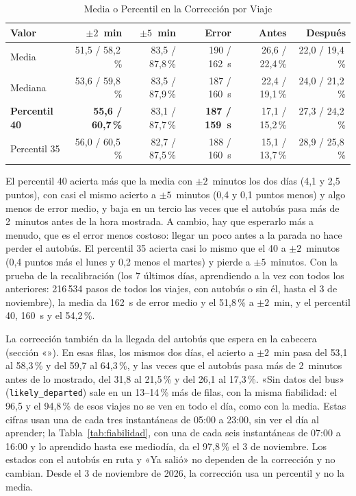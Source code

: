 \begin{table}[ht]
\centering
\caption{Media o Percentil en la Corrección por Viaje}\label{tab:percentil}
\begin{tabular}{@{}lrrrrr@{}}
\toprule
Valor & $\pm2$~min & $\pm5$~min & Error & Antes & Después\\
\midrule
Media & 51,5 / 58,2\,\% & 83,5 / 87,8\,\% & 190 / 162~s & 26,6 / 22,4\,\% & 22,0 / 19,4\,\%\\
Mediana & 53,6 / 59,8\,\% & 83,5 / 87,9\,\% & 187 / 160~s & 22,4 / 19,1\,\% & 24,0 / 21,2\,\%\\
\textbf{Percentil 40} & \textbf{55,6 / 60,7\,\%} & 83,1 / 87,7\,\% & \textbf{187 / 159~s} & 17,1 / 15,2\,\% & 27,3 / 24,2\,\%\\
Percentil 35 & 56,0 / 60,5\,\% & 82,7 / 87,5\,\% & 188 / 160~s & 15,1 / 13,7\,\% & 28,9 / 25,8\,\%\\
\bottomrule
\end{tabular}
\end{table}

El percentil 40 acierta más que la media con $\pm2$~minutos los dos días (4,1 y 2,5 puntos), con casi el mismo acierto
a $\pm5$~minutos (0,4 y 0,1 puntos menos) y algo menos de error medio, y baja en un tercio las veces que el autobús pasa
más de 2~minutos antes de la hora mostrada. A cambio, hay que esperarlo más a menudo, que es el error menos costoso:
llegar un poco antes a la parada no hace perder el autobús. El percentil 35 acierta casi lo mismo que el 40 a $\pm2$~minutos (0,4 puntos más el lunes y 0,2 menos el
martes) y pierde a $\pm5$~minutos. Con la prueba de la recalibración (los 7 últimos días, aprendiendo a la vez con todos los anteriores:
216\,534 pasos de todos los viajes, con autobús o sin él, hasta el 3 de noviembre), la media da 162~s de error medio y
el 51,8\,\% a $\pm2$~min, y el percentil 40, 160~s y el 54,2\,\%.

La corrección también da la llegada del autobús que espera en la cabecera (sección «»). En esas
filas, los mismos dos días, el acierto a $\pm2$~min pasa del 53,1 al 58,3\,\% y del 59,7 al 64,3\,\%, y las veces que
el autobús pasa más de 2~minutos antes de lo mostrado, del 31,8 al 21,5\,\% y del 26,1 al 17,3\,\%. «Sin datos del
bus» (\texttt{likely\_departed}) sale en un 13--14\,\% más de filas, con la misma fiabilidad: el 96,5 y el 94,8\,\% de
esos viajes no se ven en todo el día, como con la media. Estas cifras usan una de cada tres instantáneas de 05:00 a
23:00, sin ver el día al aprender; la Tabla~\ref{tab:fiabilidad}, con una de cada seis instantáneas de 07:00 a 16:00 y
lo aprendido hasta ese mediodía, da el 97{,}8\,\% el 3 de noviembre. Los estados con el autobús en ruta y «Ya salió» no
dependen de la corrección y no cambian. Desde el 3 de noviembre de 2026, la corrección usa un percentil y no la media.

